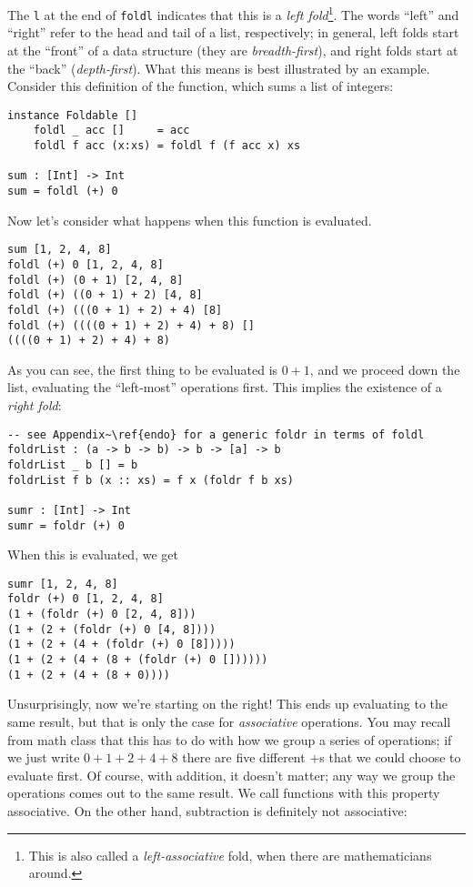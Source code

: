 The \texttt{l} at the end of \texttt{foldl} indicates that this is a \emph{left fold}\footnote{This is also called a \emph{left-associative} fold, when there are mathematicians around.}. The words ``left'' and ``right'' refer to the head and tail of a list, respectively; in general, left folds start at the ``front'' of a data structure (they are \emph{breadth-first}), and right folds start at the ``back'' (\emph{depth-first}). What this means is best illustrated by an example. Consider this definition of the  function, which sums a list of integers:

\begin{lstlisting}[language=pseudoml]
instance Foldable []
    foldl _ acc []     = acc
    foldl f acc (x:xs) = foldl f (f acc x) xs

sum : [Int] -> Int
sum = foldl (+) 0
\end{lstlisting}

Now let's consider what happens when this function is evaluated.

\begin{verbatim}
sum [1, 2, 4, 8]
foldl (+) 0 [1, 2, 4, 8]
foldl (+) (0 + 1) [2, 4, 8]
foldl (+) ((0 + 1) + 2) [4, 8]
foldl (+) (((0 + 1) + 2) + 4) [8]
foldl (+) ((((0 + 1) + 2) + 4) + 8) []
((((0 + 1) + 2) + 4) + 8)
\end{verbatim}

As you can see, the first thing to be evaluated is \( 0 + 1 \), and we proceed down the list, evaluating the ``left-most'' operations first. This implies the existence of a \emph{right fold}:

\begin{lstlisting}[language=pseudoml,texcl]
-- see Appendix~\ref{endo} for a generic foldr in terms of foldl
foldrList : (a -> b -> b) -> b -> [a] -> b
foldrList _ b [] = b
foldrList f b (x :: xs) = f x (foldr f b xs)

sumr : [Int] -> Int
sumr = foldr (+) 0
\end{lstlisting}

When this is evaluated, we get

\begin{verbatim}
sumr [1, 2, 4, 8]
foldr (+) 0 [1, 2, 4, 8]
(1 + (foldr (+) 0 [2, 4, 8]))
(1 + (2 + (foldr (+) 0 [4, 8])))
(1 + (2 + (4 + (foldr (+) 0 [8]))))
(1 + (2 + (4 + (8 + (foldr (+) 0 [])))))
(1 + (2 + (4 + (8 + 0))))
\end{verbatim}

Unsurprisingly, now we're starting on the right! This ends up evaluating to the same result, but that is only the case for \emph{associative} operations. You may recall from math class that this has to do with how we group a series of operations; if we just write \( 0 + 1 + 2 + 4 + 8 \) there are five different \( + \)s that we could choose to evaluate first. Of course, with addition, it doesn't matter; any way we group the operations comes out to the same result. We call functions with this property associative. On the other hand, subtraction is definitely not associative:

